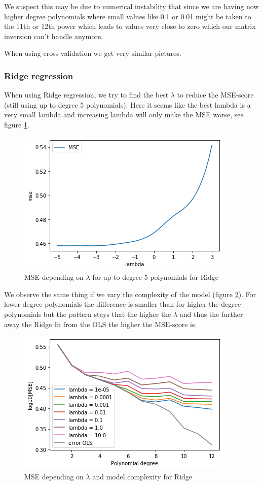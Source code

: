\documentclass[12pt]{extarticle}
\begin{document}
We suspect this may be due to numerical instability that since we are having now higher degree polynomials where small values like 0.1 or 0.01 might be taken to the 11th or 12th power which leads to values very close to zero which our matrix inversion can't handle anymore.

When using cross-validation we get very similar pictures.

\subsubsection{Ridge regression}

When using Ridge regression, we try to find the best $\lambda$ to reduce the MSE-score (still using up to degree 5 polynomials). Here it seems like the best lambda is a very small lambda and increasing lambda will only make the MSE worse, see figure \ref{fig:t4}.

\begin{figure}
    \centering
    \includegraphics{t7}
    \caption{MSE depending on $\lambda$ for up to degree 5 polynomials for Ridge}
    \label{fig:t4}
\end{figure}

We observe the same thing if we vary the complexity of the model (figure \ref{fig:t5}). For lower degree polynomials the difference is smaller than for higher the degree polynomials but the pattern stays that the higher the $\lambda$ and thus the further away the Ridge fit from the OLS the higher the MSE-score is.

\begin{figure}
    \centering
    \includegraphics{t8}
    \caption{MSE depending on $\lambda$ and model complexity for Ridge}
    \label{fig:t5}
\end{figure}
\end{document}
